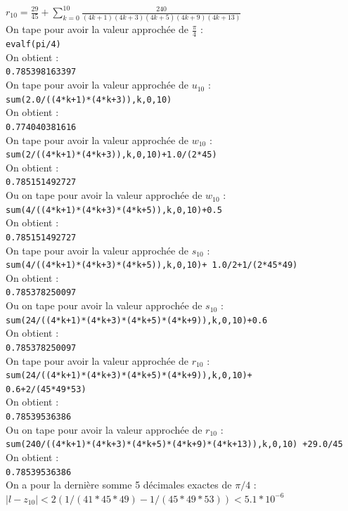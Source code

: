 \documentclass[a4paper,11pt]{book}
\begin{document}
$\displaystyle r_{10}=\frac{29}{45}+\sum_{k=0}^{10} \frac{240}{(4k+1)(4k+3)(4k+5)(4k+9)(4k+13)}$\\
On tape pour avoir la valeur approch\'ee de $\frac{\pi}{4}$ :\\
{\tt evalf(pi/4)}\\
On obtient :\\
{\tt 0.785398163397}\\
On tape pour avoir la valeur approch\'ee de $u_{10}$ :\\
{\tt sum(2.0/((4*k+1)*(4*k+3)),k,0,10)}\\
On obtient :\\
{\tt 0.774040381616}\\
On tape pour avoir la valeur approch\'ee de $w_{10}$ :\\
{\tt sum(2/((4*k+1)*(4*k+3)),k,0,10)+1.0/(2*45)}\\
On obtient :\\
{\tt 0.785151492727}\\ 
Ou on tape pour avoir la valeur approch\'ee de $w_{10}$ :\\
{\tt sum(4/((4*k+1)*(4*k+3)*(4*k+5)),k,0,10)+0.5}\\
On obtient :\\
{\tt 0.785151492727}\\
On tape pour avoir la valeur approch\'ee de $s_{10}$ :\\
{\tt sum(4/((4*k+1)*(4*k+3)*(4*k+5)),k,0,10)+
1.0/2+1/(2*45*49)}\\
On obtient :\\
{\tt 0.785378250097}\\
Ou on tape pour avoir la valeur approch\'ee de $s_{10}$ :\\
{\tt sum(24/((4*k+1)*(4*k+3)*(4*k+5)*(4*k+9)),k,0,10)+0.6}\\
On obtient :\\
{\tt 0.785378250097}\\
On tape pour avoir la valeur approch\'ee de $r_{10}$ :\\
{\tt sum(24/((4*k+1)*(4*k+3)*(4*k+5)*(4*k+9)),k,0,10)+\\0.6+2/(45*49*53)}\\
On obtient :\\
{\tt 0.78539536386}\\
Ou on tape pour avoir la valeur approch\'ee de $r_{10}$ :\\
{\tt sum(240/((4*k+1)*(4*k+3)*(4*k+5)*(4*k+9)*(4*k+13)),k,0,10)
+29.0/45}\\
On obtient :\\
{\tt 0.78539536386}\\
On a pour la derni\`ere somme 5 d\'ecimales exactes de $\pi/4$ :\\
$|l-z_{10}|<2(1/(41*45*49)-1/(45*49*53))<5.1* 10^{-6}$
\end{document}
